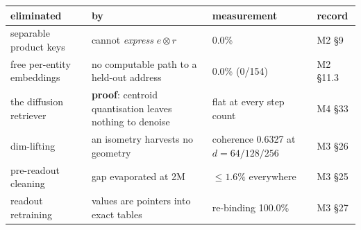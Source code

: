 \footnotesize
\begin{tabular}{@{}p{3.0cm}p{5.3cm}p{4.0cm}p{1.9cm}@{}}
\toprule
eliminated & by & measurement & record \\
\midrule
separable product keys & cannot \emph{express} $e\otimes r$ & 0.0\% & M2 \S9 \\
free per-entity embeddings & no computable path to a held-out address & 0.0\% (0/154) & M2 \S11.3 \\
the diffusion retriever & \textbf{proof}: centroid quantisation leaves nothing to denoise & flat at every step count & M4 \S33 \\
dim-lifting & an isometry harvests no geometry & coherence 0.6327 at $d=64/128/256$ & M3 \S26 \\
pre-readout cleaning & gap evaporated at 2M & $\le 1.6\%$ everywhere & M3 \S25 \\
readout retraining & values are pointers into exact tables & re-binding 100.0\% & M3 \S27 \\
\bottomrule
\end{tabular}
